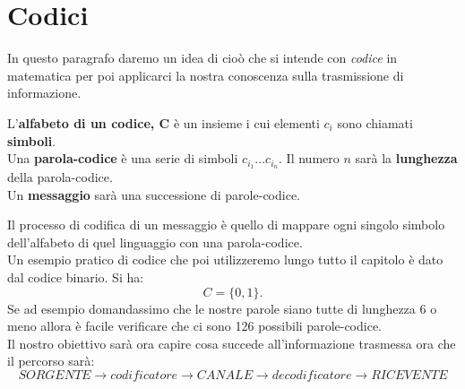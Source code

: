 \section{Codici}
\label{sec:Codici}
In questo paragrafo daremo un idea di cioò che si intende con \textit{codice} in matematica per poi applicarci la nostra conoscenza sulla trasmissione di informazione.\\
\begin{defi}
L'\textbf{alfabeto di un codice, C} è un insieme \acode i cui elementi $c_i$ sono chiamati \textbf{simboli}.\\
Una \textbf{parola-codice} è una serie di simboli $c_{i_1}...c_{i_n}$. Il numero $n$ sarà la \textbf{lunghezza} della parola-codice.\\
Un \textbf{messaggio} sarà una successione di parole-codice.
\end{defi}
Il processo di codifica di un messaggio è quello di mappare ogni singolo  simbolo dell'alfabeto di quel linguaggio con una parola-codice.\\
Un esempio pratico di codice che poi utilizzeremo lungo tutto il capitolo è dato dal codice binario. Si ha:
$$C=\{0, 1 \}.$$
Se ad esempio domandassimo che le nostre parole siano tutte di lunghezza 6 o meno allora è facile verificare che ci sono 126 possibili parole-codice.\\
Il nostro obiettivo sarà ora capire cosa succede all'informazione trasmessa ora che il percorso sarà:
$$ SORGENTE \to codificatore \to CANALE \to decodificatore \to RICEVENTE$$












